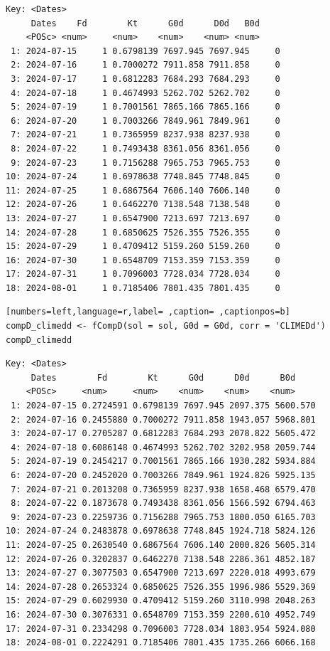 \begin{itemize}
\begin{verbatim}
Key: <Dates>
	 Dates    Fd        Kt      G0d      D0d   B0d
	<POSc> <num>     <num>    <num>    <num> <num>
 1: 2024-07-15     1 0.6798139 7697.945 7697.945     0
 2: 2024-07-16     1 0.7000272 7911.858 7911.858     0
 3: 2024-07-17     1 0.6812283 7684.293 7684.293     0
 4: 2024-07-18     1 0.4674993 5262.702 5262.702     0
 5: 2024-07-19     1 0.7001561 7865.166 7865.166     0
 6: 2024-07-20     1 0.7003266 7849.961 7849.961     0
 7: 2024-07-21     1 0.7365959 8237.938 8237.938     0
 8: 2024-07-22     1 0.7493438 8361.056 8361.056     0
 9: 2024-07-23     1 0.7156288 7965.753 7965.753     0
10: 2024-07-24     1 0.6978638 7748.845 7748.845     0
11: 2024-07-25     1 0.6867564 7606.140 7606.140     0
12: 2024-07-26     1 0.6462270 7138.548 7138.548     0
13: 2024-07-27     1 0.6547900 7213.697 7213.697     0
14: 2024-07-28     1 0.6850625 7526.355 7526.355     0
15: 2024-07-29     1 0.4709412 5159.260 5159.260     0
16: 2024-07-30     1 0.6548709 7153.359 7153.359     0
17: 2024-07-31     1 0.7096003 7728.034 7728.034     0
18: 2024-08-01     1 0.7185406 7801.435 7801.435     0
\end{verbatim}

\begin{lstlisting}[numbers=left,language=r,label= ,caption= ,captionpos=b]
compD_climedd <- fCompD(sol = sol, G0d = G0d, corr = 'CLIMEDd')
compD_climedd
\end{lstlisting}

\begin{verbatim}
Key: <Dates>
	 Dates        Fd        Kt      G0d      D0d      B0d
	<POSc>     <num>     <num>    <num>    <num>    <num>
 1: 2024-07-15 0.2724591 0.6798139 7697.945 2097.375 5600.570
 2: 2024-07-16 0.2455880 0.7000272 7911.858 1943.057 5968.801
 3: 2024-07-17 0.2705287 0.6812283 7684.293 2078.822 5605.472
 4: 2024-07-18 0.6086148 0.4674993 5262.702 3202.958 2059.744
 5: 2024-07-19 0.2454217 0.7001561 7865.166 1930.282 5934.884
 6: 2024-07-20 0.2452020 0.7003266 7849.961 1924.826 5925.135
 7: 2024-07-21 0.2013208 0.7365959 8237.938 1658.468 6579.470
 8: 2024-07-22 0.1873678 0.7493438 8361.056 1566.592 6794.463
 9: 2024-07-23 0.2259736 0.7156288 7965.753 1800.050 6165.703
10: 2024-07-24 0.2483878 0.6978638 7748.845 1924.718 5824.126
11: 2024-07-25 0.2630540 0.6867564 7606.140 2000.826 5605.314
12: 2024-07-26 0.3202837 0.6462270 7138.548 2286.361 4852.187
13: 2024-07-27 0.3077503 0.6547900 7213.697 2220.018 4993.679
14: 2024-07-28 0.2653324 0.6850625 7526.355 1996.986 5529.369
15: 2024-07-29 0.6029930 0.4709412 5159.260 3110.998 2048.263
16: 2024-07-30 0.3076331 0.6548709 7153.359 2200.610 4952.749
17: 2024-07-31 0.2334298 0.7096003 7728.034 1803.954 5924.080
18: 2024-08-01 0.2224291 0.7185406 7801.435 1735.266 6066.168
\end{verbatim}


\end{itemize}
